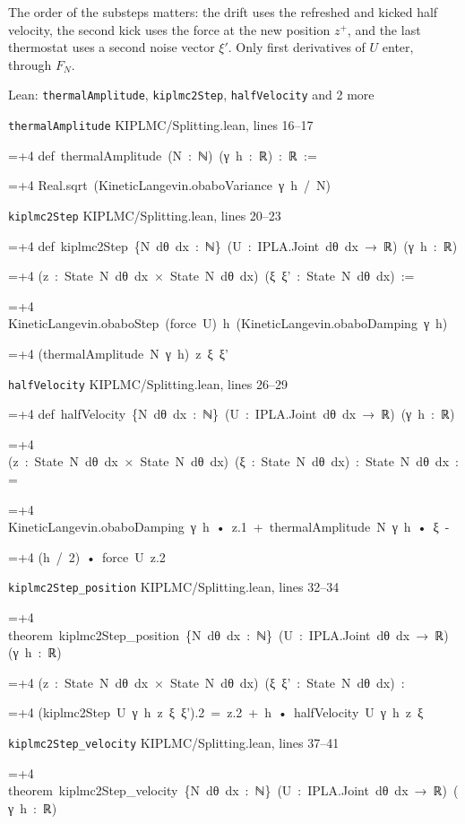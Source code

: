\documentclass[11pt,a4paper]{report}
\newlength{\leancharwidth}
\newenvironment{leancode}{\par\smallskip\begingroup\ttfamily\footnotesize\raggedright
  \settowidth{\leancharwidth}{M}\setlength{\parskip}{0pt}\setlength{\parindent}{0pt}
  \frenchspacing}{\par\endgroup\smallskip}
\newcommand{\leanline}[2]{\hangindent=\dimexpr#1\leancharwidth+4\leancharwidth\relax
  \hangafter=1\noindent\hspace*{#1\leancharwidth}#2\par}
\newcommand{\leansource}[1]{\par{\footnotesize\color{leanmuted}#1}\par}
\begin{document}
The order of the substeps matters: the drift uses the refreshed and kicked half velocity, the second kick uses the force at the new position \(z^+\), and the last thermostat uses a second noise vector \(\xi'\). Only first derivatives of \(U\) enter, through \(F_N\).

\begin{leanbox}{Lean: \texttt{thermalAmplitude}, \texttt{kiplmc2Step}, \texttt{halfVelocity} and 2 more}
\leansource{\texttt{thermalAmplitude} \quad KIPLMC/\allowbreak{}Splitting.lean, lines 16–17}
\begin{leancode}
\leanline{0}{def\ thermalAmplitude\ (N\ :\ ℕ)\ (γ\ h\ :\ ℝ)\ :\ ℝ\ :=}
\leanline{2}{Real.sqrt\ (KineticLangevin.obaboVariance\ γ\ h\ /\ N)}
\end{leancode}
\leansource{\texttt{kiplmc2Step} \quad KIPLMC/\allowbreak{}Splitting.lean, lines 20–23}
\begin{leancode}
\leanline{0}{def\ kiplmc2Step\ \{N\ dθ\ dx\ :\ ℕ\}\ (U\ :\ IPLA.Joint\ dθ\ dx\ →\ ℝ)\ (γ\ h\ :\ ℝ)}
\leanline{4}{(z\ :\ State\ N\ dθ\ dx\ ×\ State\ N\ dθ\ dx)\ (ξ\ ξ'\ :\ State\ N\ dθ\ dx)\ :=}
\leanline{2}{KineticLangevin.obaboStep\ (force\ U)\ h\ (KineticLangevin.obaboDamping\ γ\ h)}
\leanline{4}{(thermalAmplitude\ N\ γ\ h)\ z\ ξ\ ξ'}
\end{leancode}
\leansource{\texttt{halfVelocity} \quad KIPLMC/\allowbreak{}Splitting.lean, lines 26–29}
\begin{leancode}
\leanline{0}{def\ halfVelocity\ \{N\ dθ\ dx\ :\ ℕ\}\ (U\ :\ IPLA.Joint\ dθ\ dx\ →\ ℝ)\ (γ\ h\ :\ ℝ)}
\leanline{4}{(z\ :\ State\ N\ dθ\ dx\ ×\ State\ N\ dθ\ dx)\ (ξ\ :\ State\ N\ dθ\ dx)\ :\ State\ N\ dθ\ dx\ :=}
\leanline{2}{KineticLangevin.obaboDamping\ γ\ h\ •\ z.1\ +\ thermalAmplitude\ N\ γ\ h\ •\ ξ\ -}
\leanline{4}{(h\ /\ 2)\ •\ force\ U\ z.2}
\end{leancode}
\leansource{\texttt{kiplmc2Step\_\allowbreak{}position} \quad KIPLMC/\allowbreak{}Splitting.lean, lines 32–34}
\begin{leancode}
\leanline{0}{theorem\ kiplmc2Step\_position\ \{N\ dθ\ dx\ :\ ℕ\}\ (U\ :\ IPLA.Joint\ dθ\ dx\ →\ ℝ)\ (γ\ h\ :\ ℝ)}
\leanline{4}{(z\ :\ State\ N\ dθ\ dx\ ×\ State\ N\ dθ\ dx)\ (ξ\ ξ'\ :\ State\ N\ dθ\ dx)\ :}
\leanline{4}{(kiplmc2Step\ U\ γ\ h\ z\ ξ\ ξ').2\ =\ z.2\ +\ h\ •\ halfVelocity\ U\ γ\ h\ z\ ξ}
\end{leancode}
\leansource{\texttt{kiplmc2Step\_\allowbreak{}velocity} \quad KIPLMC/\allowbreak{}Splitting.lean, lines 37–41}
\begin{leancode}
\leanline{0}{theorem\ kiplmc2Step\_velocity\ \{N\ dθ\ dx\ :\ ℕ\}\ (U\ :\ IPLA.Joint\ dθ\ dx\ →\ ℝ)\ (γ\ h\ :\ ℝ)}

\end{leancode}
\end{leanbox}
\end{document}
